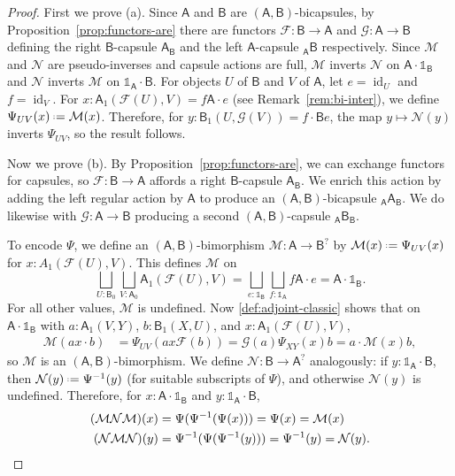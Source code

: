 \documentclass{amsart}
\newcommand{\Cat}[1]{\mathsf{#1}}
\newcommand{\cat}[1]{\Cat{#1}}
\newcommand{\acat}[1]{\mathsf{#1}}
\numberwithin{lstfloat}{section}
\DeclareMathOperator{\id}{id}
\newcommand{\one}{\mathbb{1}}
\newcommand{\defeq}{\mathrel{\hstretch{.13}{=}\hspace{.2ex}{=}}}
\newcommand{\func}[1]{\mathcal{#1}}
\newcommand{\fF}{\func{F}}
\newcommand{\fG}{\func{G}}
\newcommand{\fM}{\func{M}}
\newcommand{\fN}{\func{N}}
\newcommand{\cA}{\cat{A}}
\newcommand{\cB}{\cat{B}}
\theoremstyle{definition}
\theoremstyle{remark}
\numberwithin{equation}{section}
\begin{document}
\begin{proof}
  First we prove (a). Since $\acat{A}$ and $\acat{B}$ are
  $(\acat{A},\acat{B})$-bicapsules, by Proposition~\ref{prop:functors-are} there
  are functors $\fF:\cB\to \cA$ and $\fG:\cA\to \cB$ defining the right
  $\cB$-capsule $\cA_{\cB}$ and the left $\cA$-capsule ${_{\cA} \cB}$
  respectively. Since $\fM$ and $\fN$ are pseudo-inverses and capsule
  actions are full, $\fM$ inverts $\fN$ on $\cA\cdot \one_{\cB}$ and $\fN$
  inverts $\fM$ on $\one_{\cA}\cdot \cB$. For objects $U$ of $\cB$ and $V$ of
  $\cA$, let $e=\id_U$ and $f=\id_V$. For $x:\cA_1(\fF(U),V)=f\cA\cdot e$ (see
  Remark~\ref{rem:bi-inter}), we define $\Psi_{UV}(x) \defeq \fM(x)$. Therefore,
  for $y:\cB_1(U,\fG(V))=f\cdot \cB e$, the map $y\mapsto \fN(y)$ inverts
  $\Psi_{UV}$, so the result follows. 

Now we prove (b). By Proposition~\ref{prop:functors-are}, we can exchange
functors for capsules, so $\fF:\cB\to \cA$ affords a right $\cB$-capsule
$\cA_{\cB}$. We enrich this action by adding the left regular action by $\cA$ to
produce an $(\cA,\cB)$-bicapsule $_{\cA}\cA_{\cB}$.  We do likewise with $\fG:\cA\to \cB$
producing a second $(\cA,\cB)$-capsule $_{\cA}\cB_{\cB}$.

To encode $\Psi$, we define an $(\cA,\cB)$-bimorphism $\fM:\cA\to \cB^?$ by
$\fM(x) \defeq \Psi_{UV}(x)$ for $x:A_1(\fF(U),V)$. This defines $\fM$ on 
\[
  \bigsqcup_{U:\cB_0}\bigsqcup_{V:\cA_0}\cA_1(\fF(U),V)
  =\bigsqcup_{e:\one_{\cB}}\bigsqcup_{f:\one_{\cA}}f\cA\cdot e
  = \cA\cdot \one_{\cB}.
\]
For all other values, $\fM$ is undefined.  Now \eqref{def:adjoint-classic} shows that  on  $\cA\cdot \one_{\cB}$ with $a:\cA_1(V,Y)$, $b:\cB_1(X,U)$, and $x : \cA_1(\fF(U),V)$, 
\begin{align*}
  \fM(ax\cdot b) & = \Psi_{UV}(ax\fF(b)) = \fG(a)\Psi_{XY}(x)b=a\cdot \fM(x)b,
\end{align*}
so $\fM$ is an $(\cA,\cB)$-bimorphism.  We define $\fN:\cB\to \cA^?$ analogously: if $y:\one_{\cA}\cdot \cB$, then  $\fN(y)\defeq \Psi^{-1}(y)$ (for suitable subscripts of $\Psi$), and otherwise $\fN(y)$ is undefined. Therefore, for $x: \acat{A}\cdot\one_{\acat{B}}$ and $y: \one_{\cA}\cdot \cB$, 
\begin{align*}
  (\fM\fN\fM)(x) & = \Psi(\Psi^{-1}(\Psi(x)))=\Psi(x)=\fM(x)\\
  (\fN\fM\fN)(y) & = \Psi^{-1}(\Psi(\Psi^{-1}(y)))=\Psi^{-1}(y)=\fN(y).  \qedhere
\end{align*} 
\end{proof}
\end{document}
